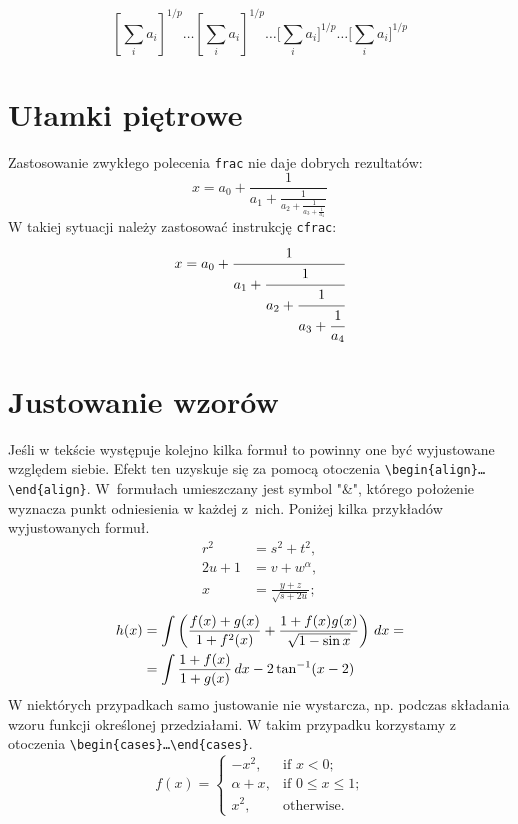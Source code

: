 \[
[ \sum_i a_i ]^{1/p} \dots  \left[ \sum_i a_i \right]^{1/p} \dots  \bigg[ \sum_i a_i \bigg]^{1/p} \dots  \Bigg[ \sum_i a_i \Bigg]^{1/p}
\]


\section{Ułamki piętrowe}

Zastosowanie zwykłego polecenia \texttt{frac} nie daje dobrych rezultatów:
\begin{equation}
  x = a_0 + \frac{1}{a_1
          + \frac{1}{a_2
          + \frac{1}{a_3 + \frac{1}{a_4} } } }
\end{equation}
W takiej sytuacji należy zastosować instrukcję \texttt{cfrac}:
\begin{equation}
  x = a_0 + \cfrac{1}{a_1
          + \cfrac{1}{a_2
          + \cfrac{1}{a_3 + \cfrac{1}{a_4} } } }
\end{equation}

\section{Justowanie wzorów}
Jeśli w tekście występuje kolejno kilka formuł to powinny one być wyjustowane względem siebie. Efekt ten uzyskuje się za pomocą otoczenia \texttt{\textbackslash begin\{align\}\dots\textbackslash end\{align\}}. W~formułach umieszczany jest symbol "\&", którego położenie wyznacza punkt odniesienia w każdej z~nich. Poniżej kilka przykładów wyjustowanych formuł.
\begin{align}
r^{2} &= s^{2} + t^{2}, \label{Eq:Pyth}\\
2u + 1 &= v + w^{\alpha}, \label{Eq:alpha}\\
x &= \frac{y + z}{\sqrt{s + 2u}};\label{Eq:frac}
\end{align}
\begin{align}
h(x) &= \int \left( \frac{f(x) + g(x)}{1+ f^{2}(x)} + \frac{1+ f(x)g(x)}{\sqrt{1 - \sin x}} \right) \, dx\label{E:longInt}=\\
&= \int \frac{1 + f(x)}{1 + g(x) } \, dx - 2 \tan^{-1}(x-2)\notag
\end{align}
W niektórych przypadkach samo justowanie nie wystarcza, np. podczas składania wzoru funkcji określonej przedziałami. W takim przypadku korzystamy z otoczenia \texttt{\textbackslash begin\{cases\}\dots \textbackslash end\{cases\}}. 
\begin{equation}
f(x)=
\begin{cases}
-x^{2}, &\text{if $x < 0$;}\\
\alpha + x, &\text{if $0 \leq x \leq 1$;}\\
x^{2}, &\text{otherwise.}
\end{cases}
\end{equation}



